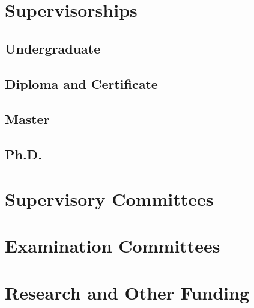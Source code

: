\documentclass[10pt,a4paper,]{twentysecondcv}
\begin{document}
\hypertarget{supervisorships}{%
\section{Supervisorships}\label{supervisorships}}

\hypertarget{undergraduate}{%
\subsection{Undergraduate}\label{undergraduate}}

\hypertarget{diploma-and-certificate}{%
\subsection{Diploma and Certificate}\label{diploma-and-certificate}}

\hypertarget{master}{%
\subsection{Master}\label{master}}

\hypertarget{ph.d.}{%
\subsection{Ph.D.}\label{ph.d.}}

\hypertarget{supervisory-committees}{%
\section{Supervisory Committees}\label{supervisory-committees}}

\hypertarget{examination-committees}{%
\section{Examination Committees}\label{examination-committees}}

\hypertarget{research-and-other-funding}{%
\section{Research and Other Funding}\label{research-and-other-funding}}

\nopagebreak
\end{document}
